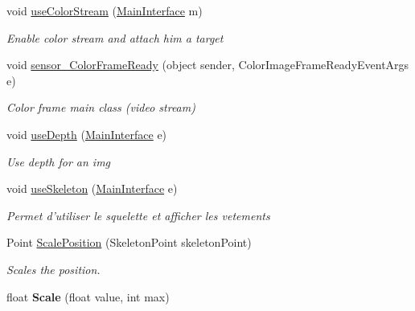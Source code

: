 \begin{DoxyCompactItemize}
void \hyperlink{class_w_p_f_page_switch_1_1_gestion_sensors_ab5f3364669a06cc4afabf29ed7de5c4a}{use\+Color\+Stream} (\hyperlink{class_w_p_f_page_switch_1_1_main_interface}{Main\+Interface} m)
\begin{DoxyCompactList}\small\item\em Enable color stream and attach him a target \end{DoxyCompactList}\item 
void \hyperlink{class_w_p_f_page_switch_1_1_gestion_sensors_a45cb637a573b863b7e326c9d23e7c687}{sensor\+\_\+\+Color\+Frame\+Ready} (object sender, Color\+Image\+Frame\+Ready\+Event\+Args e)
\begin{DoxyCompactList}\small\item\em Color frame main class (video stream) \end{DoxyCompactList}\item 
void \hyperlink{class_w_p_f_page_switch_1_1_gestion_sensors_ad38a678531279c11d032e7f476960f31}{use\+Depth} (\hyperlink{class_w_p_f_page_switch_1_1_main_interface}{Main\+Interface} e)
\begin{DoxyCompactList}\small\item\em Use depth for an img \end{DoxyCompactList}\item 
void \hyperlink{class_w_p_f_page_switch_1_1_gestion_sensors_a1e2c4d6b529f410f60429dee720cb370}{use\+Skeleton} (\hyperlink{class_w_p_f_page_switch_1_1_main_interface}{Main\+Interface} e)
\begin{DoxyCompactList}\small\item\em Permet d'utiliser le squelette et afficher les vetements \end{DoxyCompactList}\item 
Point \hyperlink{class_w_p_f_page_switch_1_1_gestion_sensors_a7ddacaa1483cada9987238a8d703b0a8}{Scale\+Position} (Skeleton\+Point skeleton\+Point)
\begin{DoxyCompactList}\small\item\em Scales the position. \end{DoxyCompactList}\item 
\hypertarget{class_w_p_f_page_switch_1_1_gestion_sensors_ab99daaeb58fdd4249f612b636118c967}{float {\bfseries Scale} (float value, int max)}\label{class_w_p_f_page_switch_1_1_gestion_sensors_ab99daaeb58fdd4249f612b636118c967}

\end{DoxyCompactItemize}
